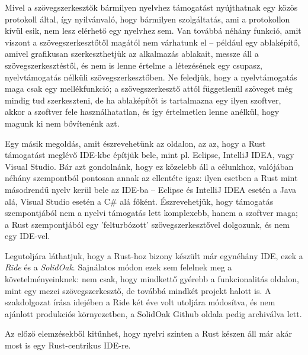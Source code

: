 Mivel a szövegszerkesztők bármilyen nyelvhez támogatást nyújthatnak egy közös protokoll által, így nyilvánvaló, hogy bármilyen szolgáltatás, ami a protokollon kívül esik, nem lesz elérhető egy nyelvhez sem. Van továbbá néhány funkció, amit viszont a szövegszerkesztőtől magától nem várhatunk el -- például egy ablaképítő, amivel grafikusan szerkeszthetjük az alkalmazás ablakait, messze áll a szövegszerkesztéstől, és nem is lenne értelme a létezésének egy csupasz, nyelvtámogatás nélküli szövegszerkesztőben. Ne feledjük, hogy a nyelvtámogatás maga csak egy mellékfunkció; a szövegszerkesztő attól függetlenül szöveget még mindig tud szerkeszteni, de ha ablaképítőt is tartalmazna egy ilyen szoftver, akkor a szoftver fele használhatatlan, és így értelmetlen lenne anélkül, hogy magunk ki nem bővítenénk azt.

Egy másik megoldás, amit észrevehetünk az oldalon, az az, hogy a Rust támogatást meglévő IDE-kbe építjük bele, mint pl. Eclipse, IntelliJ IDEA, vagy Visual Studio. Bár azt gondolnánk, hogy ez közelebb áll a célunkhoz, valójában néhány szempontból pontosan annak az ellentéte igaz: ilyen esetben a Rust mint másodrendű nyelv kerül bele az IDE-ba -- Eclipse és IntelliJ IDEA esetén a Java alá, Visual Studio esetén a C\# alá főként. Észrevehetjük, hogy támogatás szempontjából nem a nyelvi támogatás lett komplexebb, hanem a szoftver maga; a Rust szempontjából egy 'felturbózott' szövegszerkesztővel dolgozunk, és nem egy IDE-vel.

Legutoljára láthatjuk, hogy a Rust-hoz bizony készült már egynéhány IDE, ezek a \emph{Ride}\cite{ride} és a \emph{SolidOak}\cite{solidoak}. Sajnálatos módon ezek sem felelnek meg a követelményeinknek: nem csak, hogy mindkettő gyérebb a funkcionalitás oldalon, mint egy mezei szövegszerkesztő, de továbbá mindkét projekt halott is. A szakdolgozat írása idejében a Ride két éve volt utoljára módosítva, és nem ajánlott produkciós környezetben, a SolidOak Github oldala pedig archiválva lett.


Az előző elemzésekből kitűnhet, hogy nyelvi szinten a Rust készen áll már akár most is egy Rust-centrikus IDE-re. %

